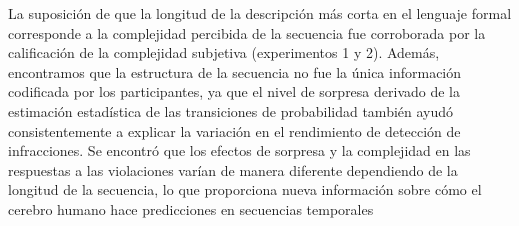 La suposición de que la longitud de la descripción más corta en el lenguaje formal corresponde a la complejidad percibida de la secuencia fue corroborada por la calificación de la complejidad subjetiva (experimentos 1 y 2). Además, encontramos que la estructura de la secuencia no fue la única información codificada por los participantes, ya que el nivel de sorpresa derivado de la estimación estadística de las transiciones de probabilidad también ayudó consistentemente a explicar la variación en el rendimiento de detección de infracciones. Se encontró que los efectos de sorpresa y la complejidad en las respuestas a las violaciones varían de manera diferente dependiendo de la longitud de la secuencia, lo que proporciona nueva información sobre cómo el cerebro humano hace predicciones en secuencias temporales


